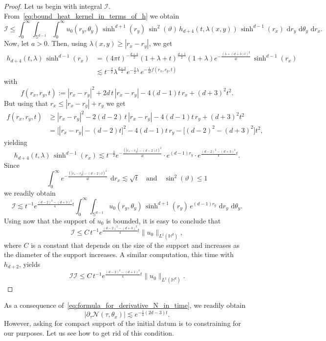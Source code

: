 \documentclass[12pt,longbibliography]{article}
\def\d{\,\mathrm{d}}
\def\d{\,\mathrm{d}}
\def\H{\mathbb{H}}
\theoremstyle{definition}
\theoremstyle{remark}
\theoremstyle{example}
\begin{document}
\begin{proof}
	Let us begin with integral $\mathcal{I}$. From~\eqref{eq:bound_heat_kernel_in_terms_of_h} we obtain
	\[
	\mathcal{I} \leq  \int_0^\infty \int_{\mathbb{S}^{d-1}}\int_{0}^\infty u_0(r_y, \theta_y)\, \sinh^{d+1}(r_y)\,\sin^2(\vartheta)\, h_{d+4}(t,\lambda(x,y))\, \sinh^{d-1}(r_x)\,\d r_y\,\d \theta_y  \, \d r_x.
	\]
	Now, let $a>0$. Then, using $\lambda(x,y)\geq |r_x-r_y|$, we get
	\[
	\begin{aligned}
		h_{d+4}(t,\lambda)\, \sinh^{d-1}(r_x)&= (4\pi t)^{-\frac{d+4}{2}}(1+\lambda+t)^{\frac{d+1}{2}}(1+\lambda)e^{-\frac{(\lambda+(d+3)t)^2}{4t}}\, \sinh^{d-1}(r_x)\\[10pt]
		&\lesssim t^{-\frac{3}{2}}\lambda^{\frac{d+3}{2}}e^{-\frac{3}{2}\lambda}\, e^{-\frac{1}{4t}f(r_x, r_y, t)}
	\end{aligned}
	\]
	with
	\[
	f(r_x, r_y, t):=|r_x-r_y|^2+2d\, t \,|r_x-r_y| - 4(d-1)t\, r_x + (d+3)^2t^2.
	\]
	But using that $r_x\leq |r_x-r_y|+r_y$ we get
	\[
	\begin{aligned}
		f(r_x, r_y, t)&\geq |r_x-r_y|^2-2(d-2)\, t \,|r_x-r_y| - 4(d-1)t\, r_y + (d+3)^2t^2\\[10pt]
		&= \big[|r_x-r_y| - (d-2)t\big]^2-4(d-1)t\, r_y -\big[(d-2)^2-(d+3)^2\big]t^2,
	\end{aligned}
	\]
	yielding
	\[
	h_{d+4}(t,\lambda)\, \sinh^{d-1}(r_x)\lesssim t^{-\frac{3}{2}}e^{-\frac{(|r_x-r_y| - (d-2)t)^2}{4t}}\cdot e^{(d-1)r_y}\cdot e^{\frac{(d-2)^2-(d+3)^2}{4}t}.
	\]
	Since
	\[
	\int_0^\infty e^{-\frac{(|r_x-r_y| - (d-2)t)^2}{4t}}\ \d r_x\lesssim \sqrt{t}\quad\text{and}\quad \sin^2(\vartheta)\leq 1
	\]
	we readily obtain
	\[
	\mathcal{I} \lesssim t^{-1}e^{\frac{(d-2)^2-(d+3)^2}{4}t}\int_0^\infty \int_{\mathbb{S}^{d-1}} u_0(r_y, \theta_y)\, \sinh^{d+1}(r_y)\, e^{(d-1)r_y}\,  \d r_y\,\d \theta_y.
	\]
	Using now that the support of $u_0$ is bounded, it is easy to conclude that
	\[
	\mathcal{I} \leq C\, t^{-1}e^{\frac{(d-2)^2-(d+3)^2}{4}t}\|u_0\|_{L^1(\H^d)},
	\]
	where $C$ is a constant that depends on the size of the support and increases as the diameter of the support increases. A similar computation, this time with $h_{d+2}$, yields
	\[
	\mathcal{II} \leq C\, t^{-1}e^{\frac{(d-2)^2-(d+1)^2}{4}t}\|u_0\|_{L^1(\H^d)}.
	\]
\end{proof}
As a consequence of~\eqref{eq:formula_for_derivative_N_in_time}, we readily obtain
\[
|\partial_\tau \mathcal{N}(\tau,\theta_x)|\lesssim e^{-\frac{1}{4}(2d-3)t}.
\]
However, asking for compact support of the initial datum is to constraining for our purposes. Let us see how to get rid of this condition.
\end{document}
